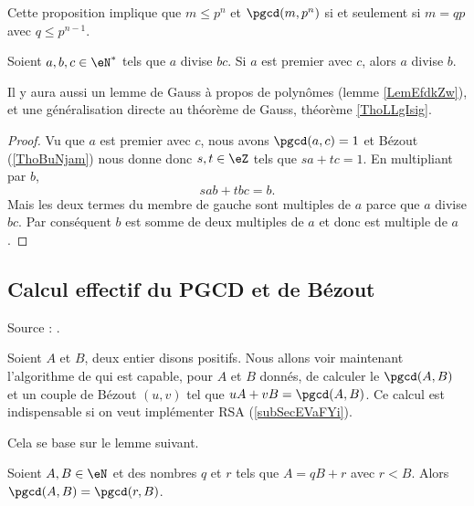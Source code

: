 Cette proposition implique que \( m\leq p^n\) et \( \pgcd(m,p^n)\) si et seulement si \( m=qp\) avec \( q\leq p^{n-1}\).

\begin{lemma}    \label{LemSdnZNX}
    Soient \( a,b,c\in \eN^*\) tels que \( a\) divise \( bc\). Si \( a\) est premier avec \( c\), alors \( a\) divise \( b\).
\end{lemma}
Il y aura aussi un lemme de Gauss à propos de polynômes (lemme \ref{LemEfdkZw}), et une généralisation directe au théorème de Gauss, théorème \ref{ThoLLgIsig}.

\begin{proof}
    Vu que \( a\) est premier avec \( c\), nous avons \( \pgcd(a,c)=1\) et Bézout (\ref{ThoBuNjam}) nous donne donc \( s,t\in \eZ\) tels que \( sa+tc=1\). En multipliant par \( b\),
    \begin{equation}
        sab+tbc=b.
    \end{equation}
    Mais les deux termes du membre de gauche sont multiples de \( a\) parce que \( a\) divise \( bc\). Par conséquent \( b\) est somme de deux multiples de \( a\) et donc est multiple de \( a\).
\end{proof}

\subsection{Calcul effectif du PGCD et de Bézout}
\label{subSecIpmnhO}

Source : \cite{BezoutCos}.

Soient \( A\) et \( B\), deux entier disons positifs. Nous allons voir maintenant l'algorithme de  qui est capable, pour \( A\) et \( B\) donnés, de calculer le \( \pgcd(A,B)\) et un couple de Bézout \( (u,v)\) tel que \( uA+vB=\pgcd(A,B)\). Ce calcul est indispensable si on veut implémenter RSA (\ref{subSecEVaFYi}).

Cela se base sur le lemme suivant.

\begin{lemma}       \label{LemiVqita}
    Soient \( A,B\in \eN\) et des nombres \( q\) et \( r\) tels que \( A=qB+r\) avec \( r<B\). Alors \( \pgcd(A,B)=\pgcd(r,B)\).
\end{lemma}

